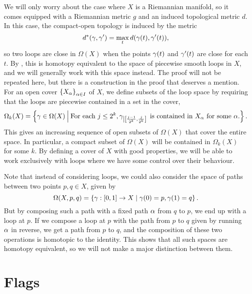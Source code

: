 We will only worry about the case where $X$ is a Riemannian manifold,
so it comes equipped with a Riemannian metric $g$ and an induced
topological metric $d$. In this case, the compact-open topology is
induced by the metric
\[ d^*(\gamma,\gamma') = \max_t d(\gamma(t),\gamma'(t)), \]
so two loops are close in $\Omega(X)$ when the points $\gamma(t)$ and
$\gamma'(t)$ are close for each $t$.
By \cite[Theorem 17.1]{milnor}, this is homotopy equivalent to the
space of piecewise smooth loops in $X$, and we will generally work
with this space instead. The proof will not be repeated here, but
there is a construction in the proof that deserves a mention. For an
open cover $\left\{ X_\alpha \right\}_{\alpha\in I}$ of $X$, we define subsets of the
loop space by requiring that the loops are piecewise contained in a
set in the cover,
\[ \Omega_k(X) = \left\{ \gamma \in \Omega(X) \: \Big\vert\:
  \text{For each } j \leq 2^k, \gamma_{\left|\left[
        \frac{j-1}{2^k},\frac{j}{2^k} \right]\right.} \text{ is 
    contained in $X_\alpha$ for some $\alpha$.}  \right\}. \]
This gives an increasing sequence of open subsets of $\Omega(X)$
that cover the entire space. In particular, a compact subset of
$\Omega(X)$ will be contained in $\Omega_k(X)$ for some $k$. By
defining a cover of $X$ with good properties, we will be able to work
exclusively with loops where we have some control
over their behaviour.



Note that instead of considering loops, we could also consider the
space of paths between two points $p,q\in X$, given by
\[ \Omega(X,p,q) = \left\{  \gamma : [0,1] \to X \mid \gamma(0) = p, \gamma(1) = q
 \right\}. \]
But by composing such a path with a fixed path $\alpha$ from $q$ to $p$,
we end up with a loop at $p$. If we compose a loop at $p$ with the
path from $p$ to $q$ given by running $\alpha$ in reverse, we get a path
from $p$ to $q$, and the composition of these two operations is
homotopic to the identity. This shows that all such spaces 
are homotopy equivalent, so we will not make a major distinction
between them.

\section{Flags}
\label{sec:flags}

